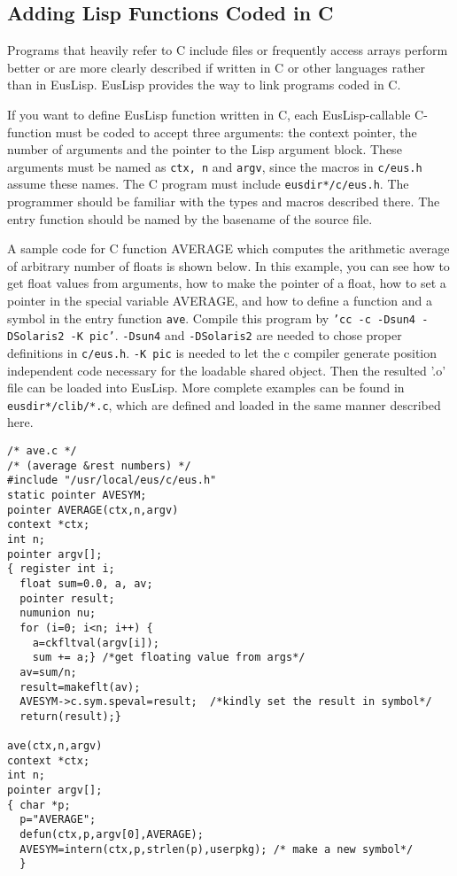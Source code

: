 \newpage

\subsection{Adding Lisp Functions Coded in C}

Programs that heavily refer to C include files or frequently access arrays
perform better or are more clearly described
if written in C or other languages rather than in EusLisp.
EusLisp provides the way to link programs coded in C.

If you want to define EusLisp function written in C,
each EusLisp-callable C-function must be coded to accept three arguments:
the context pointer, the number of arguments and the pointer to the Lisp
argument block.
These arguments must be named as {\tt ctx, n} and {\tt argv},
since the macros in {\tt c/eus.h} assume these names.
The C program must include {\tt *eusdir*/c/eus.h}.
The programmer should be familiar with the types and macros
described there.
The entry function should be named by the basename of the source file.

A sample code for C function AVERAGE which computes the arithmetic
average of arbitrary number of floats is shown below.
In this example, you can see how to get float values from arguments,
how to make the pointer of a float,
how to set a pointer in the special variable AVERAGE,
and how to define a function and a symbol in the entry function {\tt ave}.
Compile this program by {\tt 'cc -c -Dsun4 -DSolaris2 -K pic'}.
{\tt -Dsun4} and {\tt -DSolaris2} are needed
to chose proper definitions in {\tt c/eus.h}.
{\tt -K pic} is needed to let the c compiler generate position independent
code necessary for the loadable shared object. 
Then the resulted '.o' file can be loaded into EusLisp.
More complete examples can be found in {\tt *eusdir*/clib/*.c},
which are defined and loaded in the same manner described here.

\begin{verbatim}
/* ave.c */
/* (average &rest numbers) */
#include "/usr/local/eus/c/eus.h"
static pointer AVESYM;
pointer AVERAGE(ctx,n,argv)
context *ctx;
int n;
pointer argv[];
{ register int i;
  float sum=0.0, a, av;
  pointer result;
  numunion nu;
  for (i=0; i<n; i++) {
    a=ckfltval(argv[i]);
    sum += a;} /*get floating value from args*/
  av=sum/n;
  result=makeflt(av);
  AVESYM->c.sym.speval=result;  /*kindly set the result in symbol*/
  return(result);}

ave(ctx,n,argv)
context *ctx;
int n;
pointer argv[];
{ char *p;
  p="AVERAGE";
  defun(ctx,p,argv[0],AVERAGE);
  AVESYM=intern(ctx,p,strlen(p),userpkg); /* make a new symbol*/
  }     

\end{verbatim}

